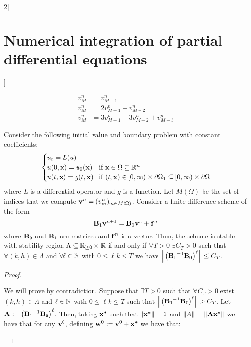 \documentclass[../../../main_math.tex]{subfiles}
\begin{document}
\begin{multicols}{2}[\section{Numerical integration of partial differential equations}]
\begin{definition}
    \begin{align*}
      v_M^{n} & =v_{M-1}^{n}                           \\
      v_M^n   & =2v_{M-1}^{n}-v_{M-2}^{n}              \\
      v_M^n   & =3v_{M-1}^{n}-3v_{M-2}^{n}+v_{M-3}^{n}
    \end{align*}
  \end{definition}
  \begin{proposition}\label{NIPDE:preLax}
    Consider the following initial value and boundary problem with constant coefficients:
    \begin{equation}\label{NIPDE:eqLax}
      \begin{cases}
        u_t=L(u)                                                                                                                    \\
        u(0,\boldsymbol{\mathrm{x}})=u_0(\boldsymbol{\mathrm{x}}) & \!\text{if }\boldsymbol{\mathrm{x}}\in\Omega \subseteq\mathbb{R}^n                                                        \\
        u(t,\boldsymbol{\mathrm{x}})=g(t,\boldsymbol{\mathrm{x}}) & \!\text{if }(t,\boldsymbol{\mathrm{x}})\in[0,\infty)\times\partial\Omega_1\subseteq [0,\infty)\times\partial\Omega
      \end{cases}
    \end{equation}
    where $L$ is a differential operator and $g$ is a function. Let $M(\Omega)$ be the set of indices that we compute $\boldsymbol{\mathrm{v}}^n=(v_m^n)_{m\in M(\Omega)}$. Consider a finite difference scheme of the form
    \begin{equation}\label{NIPDE:eqpreLax}
      \boldsymbol{\mathrm{B}}_1\boldsymbol{\mathrm{v}}^{n+1}=\boldsymbol{\mathrm{B}}_0\boldsymbol{\mathrm{v}}^n+\boldsymbol{\mathrm{f}}^n
    \end{equation}
    where $\boldsymbol{\mathrm{B}}_0$ and $\boldsymbol{\mathrm{B}}_1$ are matrices and $\boldsymbol{\mathrm{f}}^n$ is a vector. Then, the scheme is stable with stability region $\Lambda\subseteq \mathbb{R}_{\geq 0}\times\mathbb{R}$ if and only if $\forall T>0$ $\exists C_T>0$ such that $\forall (k,h)\in\Lambda$ and $\forall \ell\in\mathbb{N}$ with $0\leq \ell k\leq T$ we have $\left\|{\left({\boldsymbol{\mathrm{B}}_1}^{-1}\boldsymbol{\mathrm{B}}_0\right)}^\ell\right\|\leq C_T$.
  \end{proposition}
  \begin{proof}
    \begin{itemizeiff}
      We will prove by contradiction. Suppose that $\exists T>0$ such that $\forall C_T>0$ exist $(k,h)\in \Lambda$ and $\ell \in \mathbb{N}$ with $0\leq \ell k\leq T$ such that $\norm{{\left({\vf{B}_1}^{-1}\vf{B}_0\right)}^\ell}> C_T$. Let $\boldsymbol{\mathrm{A}}:= {\left({\boldsymbol{\mathrm{B}}_1}^{-1}\boldsymbol{\mathrm{B}}_0\right)}^\ell$. Then, taking $\boldsymbol{\mathrm{x^*}}$ such that $\left\|\boldsymbol{\mathrm{x^*}}\right\|=1$ and $\left\|A\right\|=\left\|\boldsymbol{\mathrm{A}}\boldsymbol{\mathrm{x^*}}\right\|$ we have that for any $\boldsymbol{\mathrm{v}}^0$, defining $\boldsymbol{\mathrm{w}}^0:=\boldsymbol{\mathrm{v}}^0+\boldsymbol{\mathrm{x^*}}$ we have that:

\end{itemizeiff}
\end{proof}
\end{multicols}
\end{document}
